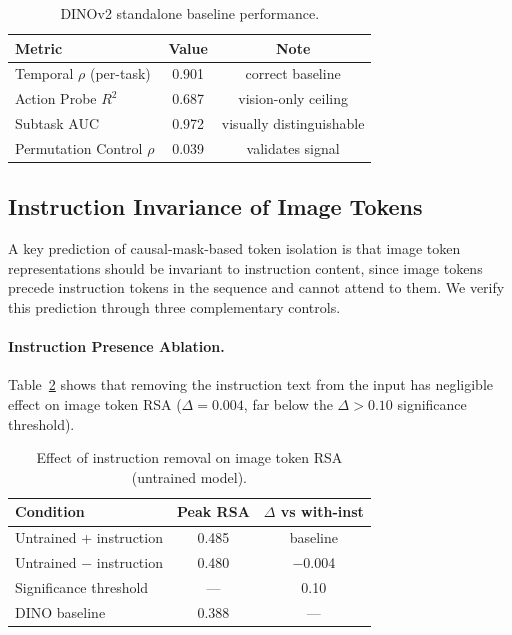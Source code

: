 \documentclass[10pt,letterpaper]{article}
\begin{document}
\begin{table}[h]
\centering
\caption{DINOv2 standalone baseline performance.}
\label{tab:dino_baseline}
\begin{tabular}{lcc}
\toprule
Metric & Value & Note \\
\midrule
Temporal $\rho$ (per-task) & 0.901 & correct baseline \\
Action Probe $R^2$ & 0.687 & vision-only ceiling \\
Subtask AUC & 0.972 & visually distinguishable \\
Permutation Control $\rho$ & 0.039 & validates signal \\
\bottomrule
\end{tabular}
\end{table}

\subsection{Instruction Invariance of Image Tokens}

A key prediction of causal-mask-based token isolation is that image token representations should be invariant to instruction content, since image tokens precede instruction tokens in the sequence and cannot attend to them. We verify this prediction through three complementary controls.

\paragraph{Instruction Presence Ablation.}
Table~\ref{tab:inst_ablation} shows that removing the instruction text from the input has negligible effect on image token RSA ($\Delta = 0.004$, far below the $\Delta > 0.10$ significance threshold).

\begin{table}[h]
\centering
\caption{Effect of instruction removal on image token RSA (untrained model).}
\label{tab:inst_ablation}
\begin{tabular}{lcc}
\toprule
Condition & Peak RSA & $\Delta$ vs with-inst \\
\midrule
Untrained + instruction & 0.485 & baseline \\
Untrained $-$ instruction & 0.480 & $-$0.004 \\
Significance threshold & --- & 0.10 \\
DINO baseline & 0.388 & --- \\
\bottomrule
\end{tabular}
\end{table}
\end{document}
